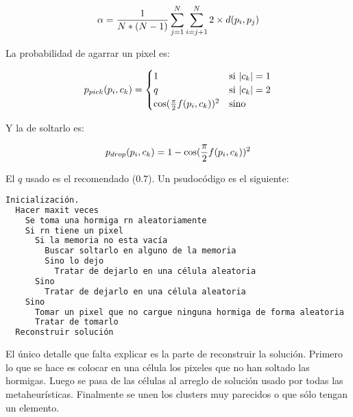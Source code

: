 \[
\alpha = {1 \over {N*(N-1)}} \sum_{j=1}^N \sum_{i=j+1}^N {2 \times d(p_i,p_j)}
\]

La probabilidad de agarrar un pixel es:

\[
p_{pick}(p_i,c_k) = 
\begin{cases}
1 & \text{si } |c_k| = 1 \\
q & \text{si } |c_k| = 2 \\
\cos( {\pi \over 2} f(p_i, c_k) )^2  & \text {sino}
\end{cases}
\]

Y la de soltarlo es:

\[
p_{drop}(p_i,c_k) = 1 - \cos( {\pi \over 2} f(p_i, c_k) )^2 
\]

El $q$ usado es el recomendado (0.7). Un psudoc\'odigo es
el siguiente:

\begin{lstlisting}[mathescape, language=Pascal]
  Inicialización.
  Hacer maxit veces
    Se toma una hormiga rn aleatoriamente
	Si rn tiene un pixel
	  Si la memoria no esta vacía
	    Buscar soltarlo en alguno de la memoria
		Sino lo dejo
		  Tratar de dejarlo en una célula aleatoria
	  Sino
	    Tratar de dejarlo en una célula aleatoria
	Sino
	  Tomar un pixel que no cargue ninguna hormiga de forma aleatoria
	  Tratar de tomarlo
  Reconstruir solución
\end{lstlisting}

El \'unico detalle que falta explicar es la parte de reconstruir la soluci\'on.
Primero lo que se hace es colocar en una c\'elula los pixeles
que no han soltado las hormigas. Luego se pasa de las c\'elulas al 
arreglo de soluci\'on usado por todas las metaheur\'isticas. Finalmente
se unen los clusters muy parecidos o que s\'olo tengan un elemento.


